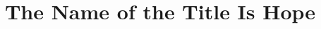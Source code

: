 \documentclass[sigconf,authordraft]{acmart}
\begin{document}
\title{The Name of the Title Is Hope}









\renewcommand{\shortauthors}{Trovato et al.}
\end{document}
